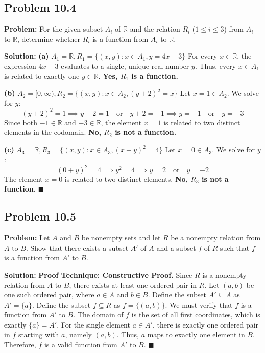 \documentclass[11pt, a4paper]{article}
\theoremstyle{definition}
\theoremstyle{remark}
\newcommand{\R}{\mathbb{R}}
\begin{document}
\subsection{Problem 10.4}
\textbf{Problem:} For the given subset $A_i$ of $\R$ and the relation $R_i$ ($1 \le i \le 3$) from $A_i$ to $\R$, determine whether $R_i$ is a function from $A_i$ to $\R$.

\textbf{Solution:}
\textbf{(a)} $A_1 = \R, R_1 = \{(x, y) : x \in A_1, y = 4x - 3\}$
For every $x \in \R$, the expression $4x - 3$ evaluates to a single, unique real number $y$. Thus, every $x \in A_1$ is related to exactly one $y \in \R$. \textbf{Yes, $R_1$ is a function.}

\textbf{(b)} $A_2 = [0, \infty), R_2 = \{(x, y) : x \in A_2, (y + 2)^2 = x\}$
Let $x = 1 \in A_2$. We solve for $y$:
\[ (y + 2)^2 = 1 \implies y + 2 = 1 \quad \text{or} \quad y + 2 = -1 \implies y = -1 \quad \text{or} \quad y = -3 \]
Since both $-1 \in \R$ and $-3 \in \R$, the element $x = 1$ is related to two distinct elements in the codomain. \textbf{No, $R_2$ is not a function.}

\textbf{(c)} $A_3 = \R, R_3 = \{(x, y) : x \in A_3, (x + y)^2 = 4\}$
Let $x = 0 \in A_3$. We solve for $y$:
\[ (0 + y)^2 = 4 \implies y^2 = 4 \implies y = 2 \quad \text{or} \quad y = -2 \]
The element $x = 0$ is related to two distinct elements. \textbf{No, $R_3$ is not a function.}
$\blacksquare$

\subsection{Problem 10.5}
\textbf{Problem:} Let $A$ and $B$ be nonempty sets and let $R$ be a nonempty relation from $A$ to $B$. Show that there exists a subset $A'$ of $A$ and a subset $f$ of $R$ such that $f$ is a function from $A'$ to $B$.

\textbf{Solution:}
\textbf{Proof Technique: Constructive Proof.}
Since $R$ is a nonempty relation from $A$ to $B$, there exists at least one ordered pair in $R$. Let $(a, b)$ be one such ordered pair, where $a \in A$ and $b \in B$.
Define the subset $A' \subseteq A$ as $A' = \{a\}$.
Define the subset $f \subseteq R$ as $f = \{(a, b)\}$.
We must verify that $f$ is a function from $A'$ to $B$. The domain of $f$ is the set of all first coordinates, which is exactly $\{a\} = A'$. For the single element $a \in A'$, there is exactly one ordered pair in $f$ starting with $a$, namely $(a, b)$. Thus, $a$ maps to exactly one element in $B$. Therefore, $f$ is a valid function from $A'$ to $B$.
$\blacksquare$
\end{document}
